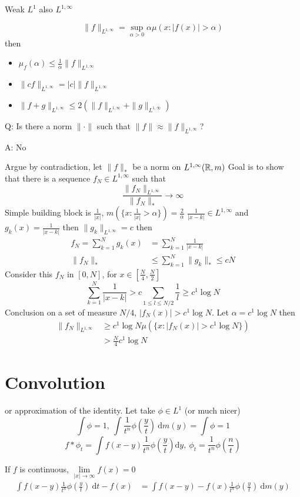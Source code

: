 Weak $L^1$ also $L^{1, \infty}$

\[\|f\|_{L^{1, \infty}} = \sup_{\alpha > 0} \alpha \mu({x : |f(x)| > \alpha})\]
then 
\begin{itemize}
  \item $\mu_f(\alpha) \le \frac1\alpha\|f\|_{L^{1, \infty}}$
  \item $\|cf\|_{L^{1, \infty}} = |c|\|f\|_{L^{1, \infty}}$
  \item $\|f + g\|_{L^{1, \infty}} \le 2(\|f\|_{L^{1, \infty}} + \|g\|_{L^{1, \infty}})$
\end{itemize}

Q: Is there a norm $\|\cdot\|$ such that $\|f\| \approx \|f\|_{L^{1, \infty}}$?

A: No

Argue by contradiction, let $\|f\|_*$ be a norm on $L^{1, \infty}(\mathbb R, m)$
Goal is to show that there is a sequence $f_{N} \in L^{1, \infty}$ such that
\[ \frac{\|f_N\|_{L^{1, \infty}}}{\|f_N\|_*}\to \infty\]
Simple building block is $\frac1{|x|}$, $m\left(\{x : \frac1{|x|} > \alpha\}\right) = \frac2\alpha$
$\frac1{|x-k|} \in L^{1, \infty}$ and $g_k(x)= \frac{1}{|x-k|}$ then
$\|g_k\|_{L^{1, \infty}} = c$ then
\begin{align*}
  f_N = \sum_{k=1}^N g_k(x) &= \sum_{k=1}^N \frac1{|x-k|} \\
  \|f_N\|_* &\le \sum_{k=1}^N \|g_k\|_* \le cN
\end{align*}
Consider this $f_N$ in $[0, N]$, for $x \in [\frac N4, \frac N2]$
\[\sum_{k=1}^N \frac1{|x-k|} > c\sum_{1 \le l \le N/2} \frac 1l \ge c^1 \log N\]
Conclusion on a set of measure $N/4$, $|f_N(x)| > c^1 \log N$.
Let $\alpha = c^1 \log N$ then 
\begin{align*}
  \|f_N\|_{L^{1, \infty}} &\ge c^1 \log N \mu(\{x : |f_N(x)| > c^1 \log N\}) \\
  &> \frac{N}4 c^1 \log N
\end{align*}

\section{Convolution}
or approximation of the identity.
Let take $\phi \in L^1$ (or much nicer)
\[\int \phi = 1,\ \int \frac1{t^n}\phi\left(\frac yt\right) \ \mathrm{d}m(y) = \int \phi = 1\]
\[f * \phi_t = \int f(x-y) \frac1{t^n}\phi\left(\frac yt\right) \mathrm{d}y,\ \phi_t = \frac1{t^n} \phi\left(\frac nt\right)\]

If $f$ is continuous, $\lim\limits_{|x|\to\infty} f(x) = 0$
\begin{align*}
  \int f(x-y) \frac{1}{t^n} \phi\left(\frac yt\right) \ \mathrm{d}t - f(x) &= \int f(x-y) - f(x) \frac1{t^n} \phi\left(\frac yt\right) \ \mathrm{d}m(y) \\
\end{align*}

